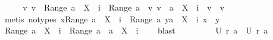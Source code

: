 \begin{isabellebody}
\isamarkupfalse%
\ {\isacharminus}\isanewline
\ \ \isamarkupfalse%
\ {\isachardoublequoteopen}{\isasymforall}v{}{\isachardot}\ v{}\ {\isasymin}\ Range\ {\isacharparenleft}a\ {\isacharminus}\ {\isacharparenleft}X\ {\isasymunion}\ {\isacharbraceleft}i{\isacharbraceright}{\isacharparenright}\ {\isasymtimes}\ Range\ a{\isacharparenright}\ {\isasymlongrightarrow}\ {\isacharparenleft}{\isasymforall}v{}{\isachardot}\ v{}\ {\isasymin}\ a\ {\isacharbackquote}{\isacharbackquote}\ {\isacharparenleft}X\ {\isasymunion}\ {\isacharbraceleft}i{\isacharbraceright}{\isacharparenright}\ {\isasymlongrightarrow}\ v{}\ {\isasyminter}\ v{}\ {\isacharequal}\ {\isacharbraceleft}{\isacharbraceright}{\isacharparenright}{\isachardoublequoteclose}\ \isanewline
{}\isamarkupfalse%
\ {\isacharparenleft}metis\ {\isacharparenleft}no{\isacharunderscore}types{\isacharparenright}\ {\isacharbackquoteopen}{\isasymforall}x{\isasymin}Range\ {\isacharparenleft}a\ {\isacharminus}\ {\isacharparenleft}X\ {\isasymunion}\ {\isacharbraceleft}i{\isacharbraceright}{\isacharparenright}\ {\isasymtimes}\ Range\ a{\isacharparenright}{\isachardot}\ {\isasymforall}y{\isasymin}a\ {\isacharbackquote}{\isacharbackquote}\ {\isacharparenleft}X\ {\isasymunion}\ {\isacharbraceleft}i{\isacharbraceright}{\isacharparenright}{\isachardot}\ x\ {\isasyminter}\ y\ {\isacharequal}\ {\isacharbraceleft}{\isacharbraceright}{\isacharbackquoteclose}{\isacharparenright}\ \isanewline
\ \ \isamarkupfalse%
\ {\isachardoublequoteopen}{\isasymUnion}Range\ {\isacharparenleft}a\ {\isacharminus}\ {\isacharparenleft}X\ {\isasymunion}\ {\isacharbraceleft}i{\isacharbraceright}{\isacharparenright}\ {\isasymtimes}\ Range\ a{\isacharparenright}\ {\isasyminter}\ {\isasymUnion}{\isacharparenleft}a\ {\isacharbackquote}{\isacharbackquote}\ {\isacharparenleft}X\ {\isasymunion}\ {\isacharbraceleft}i{\isacharbraceright}{\isacharparenright}{\isacharparenright}\ {\isacharequal}\ {\isacharbraceleft}{\isacharbraceright}{\isachardoublequoteclose}\ \isamarkupfalse%
\ blast\isanewline
{}\isamarkupfalse%
\ \isamarkupfalse%
\ \isamarkupfalse%
\ \isanewline
\ \ \ \ {\isachardoublequoteopen}{\isacharquery}U\ {\isacharparenleft}{\isacharquery}r\ {\isacharquery}a{}{\isacharparenright}\ {\isasyminter}\ {\isacharparenleft}{\isacharquery}U\ {\isacharparenleft}{\isacharquery}r\ {\isacharquery}a{}{\isacharparenright}{\isacharparenright}\ {\isacharequal}\ {\isacharbraceleft}{\isacharbraceright}{\isachardoublequoteclose}\ \isamarkupfalse%

\end{isabellebody}

